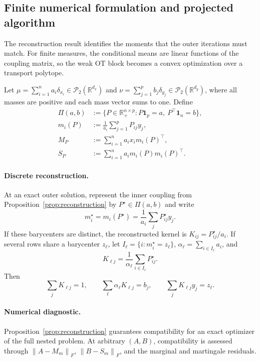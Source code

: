 \documentclass[11pt]{article}
\newcommand{\R}{\mathbb R}
\newcommand{\cP}{\mathcal P}
\newcommand{\norm}[1]{\left\lVert #1\right\rVert}
\theoremstyle{plain}
\theoremstyle{definition}
\theoremstyle{remark}
\begin{document}
\subsection{Finite numerical formulation and projected algorithm}
\label{subsec:finite-projected-algorithm}

The reconstruction result identifies the moments that the outer iterations must
match. For finite measures, the conditional means are linear functions of the
coupling matrix, so the weak OT block becomes a convex optimization over a
transport polytope.

Let \(\mu=\sum_{i=1}^n a_i\delta_{x_i}\in\cP_2(\R^{d_x})\) and
\(\nu=\sum_{j=1}^p b_j\delta_{y_j}\in\cP_2(\R^{d_y})\), where all masses are
positive and each mass vector sums to one. Define
\begin{equation}\label{eq:finite-coupling-moments}
\begin{aligned}
 \Pi(a,b)
 &:=\{P\in\R_+^{n\times p}:P\mathbf 1_p=a,\ P^\top\mathbf 1_n=b\},\\
 m_i(P)&:=\frac{1}{a_i}\sum_{j=1}^pP_{ij}y_j,\\
 M_P&:=\sum_{i=1}^n a_i x_i m_i(P)^\top,\\
 S_P&:=\sum_{i=1}^n a_i m_i(P)m_i(P)^\top.
\end{aligned}
\end{equation}

\paragraph{Discrete reconstruction.}
At an exact outer solution, represent the inner coupling from
Proposition~\ref{prop:reconstruction} by \(P^\star\in\Pi(a,b)\) and write
\[
  m_i^\star=m_i(P^\star)=\frac{1}{a_i}\sum_j P_{ij}^\star y_j.
\]
If these barycenters are distinct, the reconstructed kernel is
\(K_{ij}=P_{ij}^\star/a_i\). If several rows share a barycenter \(z_\ell\), let
\(I_\ell=\{i:m_i^\star=z_\ell\}\),
\(\alpha_\ell=\sum_{i\in I_\ell}a_i\), and
\[
  K_{\ell j}=\frac{1}{\alpha_\ell}\sum_{i\in I_\ell}P_{ij}^\star.
\]
Then
\[
  \sum_j K_{\ell j}=1,\qquad
  \sum_\ell\alpha_\ell K_{\ell j}=b_j,\qquad
  \sum_j K_{\ell j}y_j=z_\ell.
\]

\paragraph{Numerical diagnostic.}
Proposition~\ref{prop:reconstruction} guarantees compatibility for an exact optimizer
of the full nested problem. At arbitrary $(A,B)$, compatibility is assessed through
\(\norm{A-M_m}_F\), \(\norm{B-S_m}_F\), and the marginal and martingale residuals.
\end{document}
